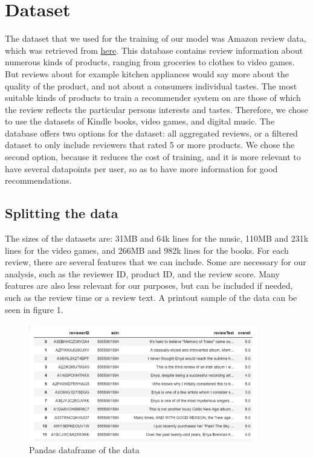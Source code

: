 \documentclass[11pt]{article}
\begin{document}
\section{Dataset}
The dataset that we used for the training of our model was Amazon review data, which was retrieved from \href{http://jmcauley.ucsd.edu/data/amazon/}{here}. This database contains review information about numerous kinds of products, ranging from groceries to clothes to video games. But reviews about for example kitchen appliances would say more about the quality of the product, and not about a consumers individual tastes. The most suitable kinds of products to train a recommender system on are those of which the review reflects the particular persons interests and tastes. Therefore, we chose to use the datasets of Kindle books, video games, and digital music. The database offers two options for the dataset: all aggregated reviews, or a filtered dataset to only include reviewers that rated 5 or more products. We chose the second option, because it reduces the cost of training, and it is more relevant to have several datapoints per user, so as to have more information for good recommendations. \\

\subsection{Splitting the data}
The sizes of the datasets are: 31MB and 64k lines for the music, 110MB and 231k lines for the video games, and 266MB and 982k lines for the books. For each review, there are several features that we can include. Some are necessary for our analysis, such as the reviewer ID, product ID, and the review score. Many features are also less relevant for our purposes, but can be included if needed, such as the review time or a review text. A printout sample of the data can be seen in figure 1. \\
\begin{figure}
    \includegraphics[width=10cm]{Pandas_df_example.png}
    \caption{Pandas dataframe of the data}
\end{figure}
\end{document}
